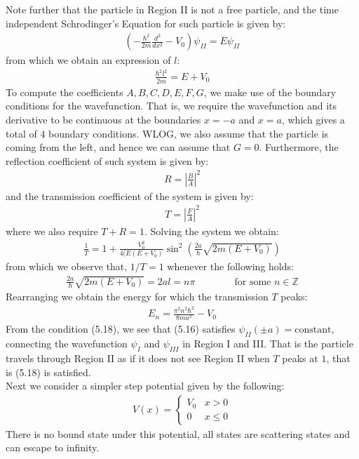 \documentclass[11pt]{book}
\theoremstyle{break}
\theoremstyle{break}
\newcommand{\Z}{\mathbb{Z}}
\begin{document}
Note further that the particle in Region II is not a free particle, and the time independent Schrodinger's Equation for such particle is given by:
\begin{align*}
\left( - \frac{\hbar^2}{2m}\frac{d^2}{dx^2} -V_0 \right) \psi_{II} = E\psi_{II}
\end{align*}
from which we obtain an expression of $l$:
\begin{align*}
\frac{\hbar^2 l^2}{2m} = E+V_0
\end{align*}
To compute the coefficients $A,B,C,D,E,F,G$, we make use of the boundary conditions for the wavefunction. That is, we require the wavefunction and its derivative to be continuous at the boundaries $x= -a$ and $x=a$, which gives a total of $4$ boundary conditions. WLOG, we also assume that the particle is coming from the left, and hence we can assume that $G = 0$. Furthermore, the reflection coefficient of such system is given by:
\begin{align*}
R = \left| \frac{B}{A}\right|^2
\end{align*}
and the transmission coefficient of the system is given by:
\begin{align*}
T = \left| \frac{F}{A}\right|^2
\end{align*}
where we also require $T + R = 1$. Solving the system we obtain:
\begin{align*}
\frac{1}{T} = 1 + \frac{V_0^2}{4(E ( E+V_0)}\sin^2\left(\frac{2a}{\hbar}\sqrt{2m(E+V_0)}\right)
\end{align*}
from which we observe that, $1/T = 1$ whenever the following holds:
\begin{align}
\frac{2a}{\hbar}\sqrt{2m(E+V_0)} = 2al = n\pi \qquad\qquad \text{for some }n\in \Z
\end{align}
Rearranging we obtain the energy for which the transmission $T$ peaks:
\begin{align*}
E_n = \frac{\pi^2 n^2 \hbar^2}{8 ma^2}- V_0
\end{align*}
From the condition (5.18), we see that (5.16) satisfies $\psi_{II}(\pm a) = \text{constant}$, connecting the wavefunction $\psi_I$ and $\psi_{III}$ in Region I and III. That is the particle travels through Region II as if it does not see Region II when $T$ peaks at $1$, that is (5.18) is satisfied.\\


Next we consider a simpler step potential given by the following:
\begin{align*}
V(x) = \begin{cases}
V_0 & x>0\\
0 & x\leq 0
\end{cases}
\end{align*}
There is no bound state under this potential, all states are scattering states and can escape to infinity.\\
\end{document}
